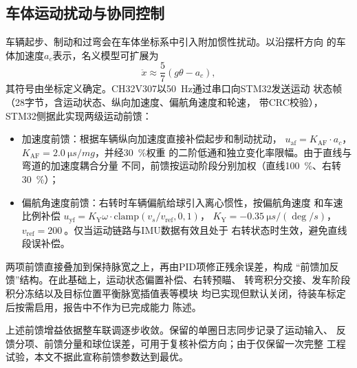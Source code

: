 \subsection{车体运动扰动与协同控制}

车辆起步、制动和过弯会在车体坐标系中引入附加惯性扰动。以沿摆杆方向
的车体加速度$a_c$表示，名义模型可扩展为
\begin{equation}
  \ddot{x}\approx\frac{5}{7}\left(g\theta-a_c\right),
  \label{eq:disturbance}
\end{equation}
其符号由坐标定义确定。CH32V307以\SI{50}{Hz}通过串口向STM32发送运动
状态帧（\SI{28}{}字节，含运动状态、纵向加速度、偏航角速度和轮速，
带CRC校验），STM32侧据此实现两级运动前馈：

\begin{itemize}
  \item 加速度前馈：根据车辆纵向加速度直接补偿起步和制动扰动，
        $u_{\mathrm{af}}=K_{\mathrm{AF}}\cdot a_{c}$，
        $K_{\mathrm{AF}}=\SI{2.0}{\micro s/mg}$，并经\SI{30}{\%}权重
        的二阶低通和独立变化率限幅。由于直线与弯道的加速度耦合分量
        不同，前馈按运动阶段分别加权（直线\SI{100}{\%}、右转
        \SI{30}{\%}）；
  \item 偏航角速度前馈：右转时车辆偏航给球引入离心惯性，按偏航角速度
        和车速比例补偿
        $u_{\mathrm{yf}}=K_{\mathrm{Y}}\omega\cdot
        \mathrm{clamp}(v_s/v_{\mathrm{ref}},0,1)$，
        $K_{\mathrm{Y}}=\SI{-0.35}{\micro s/(\deg/s)}$，
        $v_{\mathrm{ref}}=\SI{200}{}$。仅当运动链路与IMU数据有效且处于
        右转状态时生效，避免直线段误补偿。
\end{itemize}

两项前馈直接叠加到保持脉宽之上，再由PID项修正残余误差，构成
“前馈加反馈”结构。在此基础上，运动状态偏置补偿、右转预瞄、
转弯积分交接、发车阶段积分冻结以及目标位置平衡脉宽插值表等模块
均已实现但默认关闭，待装车标定后按需启用，报告中不作为已完成能力
陈述。

上述前馈增益依据整车联调逐步收敛。保留的单圈日志同步记录了运动输入、
反馈分项、前馈分量和球位误差，可用于复核补偿方向；由于仅保留一次完整
工程试验，本文不据此宣称前馈参数达到最优。
